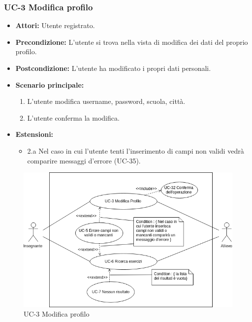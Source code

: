 \subsubsection{UC-3 Modifica profilo}
		\begin{itemize}
			\item \textbf{Attori:} Utente registrato.
			\item \textbf{Precondizione:} L'utente si trova nella vista di modifica dei dati del proprio profilo.
			\item \textbf{Postcondizione:} L'utente ha modificato i propri dati personali.
			\item \textbf{Scenario principale:}
				\begin{enumerate}
					\item L'utente modifica username, password, scuola, città.
					\item L'utente conferma la modifica. 
				\end{enumerate}
				\item \textbf{Estensioni:}
				\begin{itemize}
					\item 2.a Nel caso in cui l'utente tenti l'inserimento di campi non validi vedrà comparire messaggi d'errore (UC-35).
				\end{itemize}
		\end{itemize}
		\begin{figure}[htbp]
			\centering
			\includegraphics[scale=0.7]{images/UC-3.png}
			\caption{UC-3 Modifica profilo}
		\end{figure}
	

